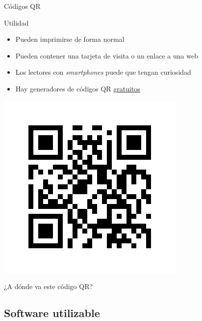 \documentclass[xcolor=svgnames,compress]{beamer}
\begin{document}
\begin{frame}{Códigos QR}

  \begin{block}{Utilidad}
    \begin{itemize}
    \item Pueden imprimirse de forma normal
    \item Pueden contener una tarjeta de visita o un enlace a una web
    \item Los lectores con \emph{smartphones} puede que tengan
      curiosidad
    \item Hay generadores de códigos QR
      \href{http://zxing.appspot.com/generator/}{gratuitos}
    \end{itemize}
  \end{block}

  \begin{center}
    \includegraphics[height=.4\textheight]{qr_code}

    ¿A dónde va este código QR?
  \end{center}

\end{frame}

\subsection[Software]{Software utilizable}
\end{document}
